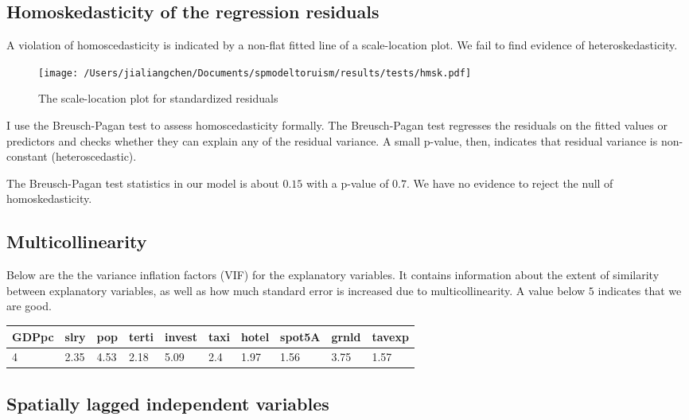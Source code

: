 \documentclass[11pt,a4paper]{amsart}
\theoremstyle{plain}
\theoremstyle{definition}
\begin{document}
\subsection{Homoskedasticity of the regression residuals}\hfill\par
A violation of homoscedasticity is indicated by a non-flat fitted line of a scale-location plot.  We fail to find evidence of heteroskedasticity. 

\begin{figure}[hbt]
	{\centering \texttt{[image: /Users/jialiangchen/Documents/spmodeltoruism/results/tests/hmsk.pdf]}}
	\caption{The scale-location plot for standardized residuals}\label{F:hmsk}
\end{figure}

I use the Breusch-Pagan test to assess homoscedasticity formally. The Breusch-Pagan test regresses the residuals on the fitted values or predictors and checks whether they can explain any of the residual variance. A small p-value, then, indicates that residual variance is non-constant (heteroscedastic). 

The Breusch-Pagan test statistics in our model is about $0.15$ with a p-value of $0.7$. We have no evidence to reject the null of homoskedasticity.

\subsection{Multicollinearity}\hfill\par
Below are the the variance inflation factors (VIF) for the explanatory variables. It contains information about the extent of similarity between explanatory variables, as well as how much standard error is increased due to multicollinearity.  A value below $5$ indicates that we are good.
\begin{table}[H]
	\centering %
	\begin{tabularx}{\textwidth}{|X|X|X|X|X|X|X|X|X|X|}
		\hline
		GDPpc   &  slry    &  pop &   terti &  invest  &   taxi   &  hotel &  spot5A   &  grnld &  tavexp \\
	\hline
	4 & 2.35 & 4.53&  2.18 &  5.09 & 2.4 & 1.97 & 1.56 & 3.75 & 1.57\\
		\hline
	\end{tabularx}
\end{table}

\subsection{Spatially lagged independent variables}\hfill\par
\end{document}
